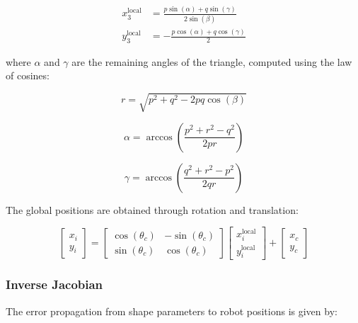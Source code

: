 \documentclass[lettersize,journal]{IEEEtran}
\begin{document}
\begin{equation}
\begin{aligned}
x_3^{\text{local}} &= \frac{p \sin(\alpha) + q \sin(\gamma)}{2 \sin(\beta)} \\
y_3^{\text{local}} &= -\frac{p \cos(\alpha) + q \cos(\gamma)}{2}
\end{aligned}
\end{equation}

where $\alpha$ and $\gamma$ are the remaining angles of the triangle, computed using the law of cosines:

\begin{equation}
r = \sqrt{p^2 + q^2 - 2pq\cos(\beta)}
\end{equation}

\begin{equation}
\alpha = \arccos\left(\frac{p^2 + r^2 - q^2}{2pr}\right)
\end{equation}

\begin{equation}
\gamma = \arccos\left(\frac{q^2 + r^2 - p^2}{2qr}\right)
\end{equation}

The global positions are obtained through rotation and translation:

\begin{equation}
\begin{bmatrix} x_i \\ y_i \end{bmatrix} = 
\begin{bmatrix} \cos(\theta_c) & -\sin(\theta_c) \\ \sin(\theta_c) & \cos(\theta_c) \end{bmatrix}
\begin{bmatrix} x_i^{\text{local}} \\ y_i^{\text{local}} \end{bmatrix} +
\begin{bmatrix} x_c \\ y_c \end{bmatrix}
\end{equation}

\subsubsection{Inverse Jacobian}

The error propagation from shape parameters to robot positions is given by:
\end{document}
